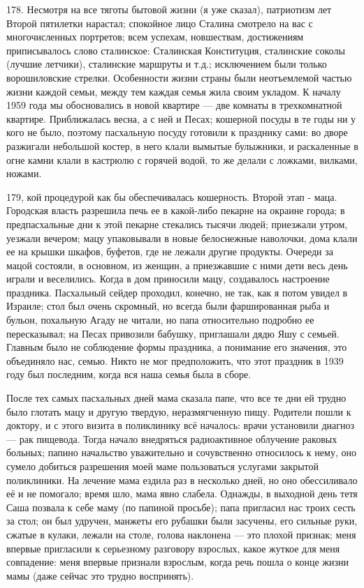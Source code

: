178. Несмотря на все тяготы бытовой жизни (я уже сказал), патриотизм лет Второй пятилетки нарастал; спокойное лицо Сталина смотрело на вас с многочисленных портретов; всем успехам, новшествам, достижениям приписывалось слово сталинское: Сталинская Конституция, сталинские соколы (лучшие летчики), сталинские маршруты и т.д.; исключением были только ворошиловские стрелки. Особенности жизни страны были неотъемлемой частью жизни каждой семьи, между тем каждая семья жила своим укладом. К началу 1959 года мы обосновались в новой квартире — две комнаты в трехкомнатной квартире. Приближалась весна, а с ней и Песах; кошерной посуды в те годы ни у кого не было, поэтому пасхальную посуду готовили к празднику сами: во дворе разжигали небольшой костер, в него клали вымытые булыжники, и раскаленные в огне камни клали в кастрюлю с горячей водой, то же делали с ложками, вилками, ножами.

179, кой процедурой как бы обеспечивалась кошерность. Второй этап - маца. Городская власть разрешила печь ее в какой-либо пекарне на окраине города; в предпасхальные дни к этой пекарне стекались тысячи людей; приезжали утром, уезжали вечером; мацу упаковывали в новые белоснежные наволочки, дома клали ее на крышки шкафов, буфетов, где не лежали другие продукты. Очереди за мацой состояли, в основном, из женщин, а приезжавшие с ними дети весь день играли и веселились. Когда в дом приносили мацу, создавалось настроение праздника. Пасхальный сейдер проходил, конечно, не так, как я потом увидел в Израиле; стол был очень скромный, но всегда были фаршированная рыба и бульон, похальную Агаду не читали, но папа относительно подробно ее пересказывал; на Песах привозили бабушку, приглашали дядю Яшу с семьей. Главным было не соблюдение формы праздника, а понимание его значения, это объединяло нас, семью. Никто не мог предположить, что этот праздник в 1939 году был последним, когда вся наша семья была в сборе.

После тех самых пасхальных дней мама сказала папе, что все те дни ей трудно было глотать мацу и другую твердую, неразмягченную пищу. Родители пошли к доктору, и с этого визита в поликлинику всё началось: врачи установили диагноз — рак пищевода. Тогда начало внедряться радиоактивное облучение раковых больных; папино начальство уважительно и сочувственно относилось к нему, оно сумело добиться разрешения моей маме пользоваться услугами закрытой поликлиники. На лечение мама ездила раз в несколько дней, но оно обессиливало её и не помогало; время шло, мама явно слабела. Однажды, в выходной день тетя Саша позвала к себе маму (по папиной просьбе); папа пригласил нас троих сесть за стол; он был удручен, манжеты его рубашки были засучены, его сильные руки, сжатые в кулаки, лежали на столе, голова наклонена — это плохой признак; меня впервые пригласили к серьезному разговору взрослых, какое жуткое для меня совпадение: меня впервые признали взрослым, когда речь пошла о конце жизни мамы (даже сейчас это трудно воспринять).


